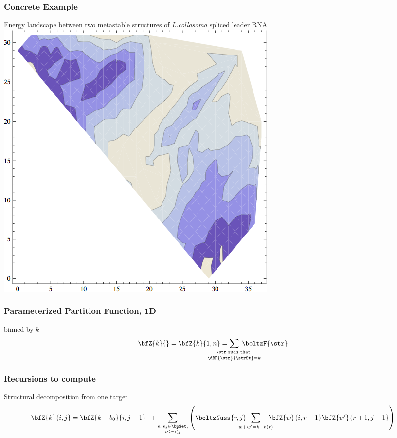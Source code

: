 \documentclass{beamer}
\begin{document}
\begin{frame}
  \frametitle{Concrete Example}
  \begin{block}{Energy landscape between two metastable structures of {\em L.collosoma} spliced leader RNA}
  \vspace{1em}
  \centering\includegraphics[scale=.5]{2dgrid.png}
  \end{block}
\end{frame}

\begin{frame}
  \frametitle{Parameterized Partition Function, 1D}
  \begin{block}{\bfZ{}{} binned by $k$}
  \begin{align*}
  \bfZ{k}{} = \bfZ{k}{1,n} =
  \sum_{\mathclap{\substack{\str \text{ such that }\rule[-.5ex]{0pt}{0pt} \\ \dBP{\str}{\strSt}=k}}}\;
  \boltzF{\str}
  \end{align*}
  \end{block}
\end{frame}

\begin{frame}
  \frametitle{Recursions to compute }
  \begin{block}{Structural decomposition from one target}
  \begin{align*}
    \bfZ{k}{i,j} = \bfZ{k-b_0}{i,j-1}\enspace +
  \sum_{\substack{s_r s_j \in \bpSet, \\ i \le r<j}}
  \left(
  \boltzNuss{r,j}\enspace \sum_{\mathclap{w+w'=k-b(r)}}\quad
  \bfZ{w}{i,r-1} \bfZ{w'}{r+1,j-1}
  \right)
  \end{align*}
  \end{block}
\end{frame}
\end{document}
